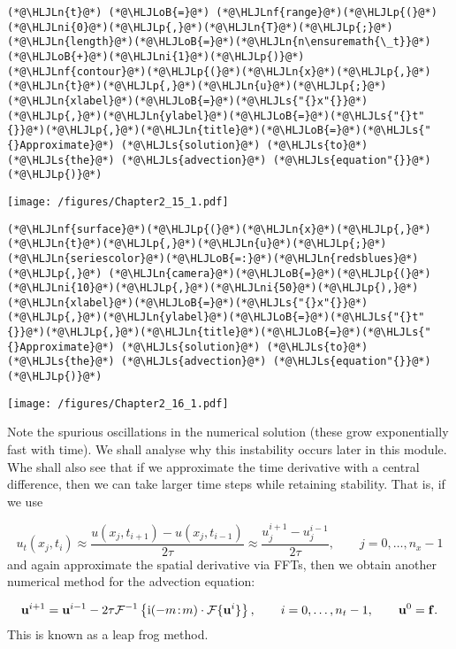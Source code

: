 \documentclass[12pt,a4paper]{article}
\newcommand{\HLJLn}[1]{#1}
\newcommand{\HLJLnf}[1]{\textcolor[RGB]{66,102,213}{#1}}
\newcommand{\HLJLs}[1]{\textcolor[RGB]{201,61,57}{#1}}
\newcommand{\HLJLni}[1]{\textcolor[RGB]{59,151,46}{#1}}
\newcommand{\HLJLoB}[1]{\textcolor[RGB]{102,102,102}{\textbf{#1}}}
\newcommand{\HLJLp}[1]{#1}
\begin{document}
\begin{lstlisting}
(*@\HLJLn{t}@*) (*@\HLJLoB{=}@*) (*@\HLJLnf{range}@*)(*@\HLJLp{(}@*)(*@\HLJLni{0}@*)(*@\HLJLp{,}@*)(*@\HLJLn{T}@*)(*@\HLJLp{;}@*)(*@\HLJLn{length}@*)(*@\HLJLoB{=}@*)(*@\HLJLn{n\ensuremath{\_t}}@*)(*@\HLJLoB{+}@*)(*@\HLJLni{1}@*)(*@\HLJLp{)}@*)
(*@\HLJLnf{contour}@*)(*@\HLJLp{(}@*)(*@\HLJLn{x}@*)(*@\HLJLp{,}@*)(*@\HLJLn{t}@*)(*@\HLJLp{,}@*)(*@\HLJLn{u}@*)(*@\HLJLp{;}@*)(*@\HLJLn{xlabel}@*)(*@\HLJLoB{=}@*)(*@\HLJLs{"{}x"{}}@*)(*@\HLJLp{,}@*)(*@\HLJLn{ylabel}@*)(*@\HLJLoB{=}@*)(*@\HLJLs{"{}t"{}}@*)(*@\HLJLp{,}@*)(*@\HLJLn{title}@*)(*@\HLJLoB{=}@*)(*@\HLJLs{"{}Approximate}@*) (*@\HLJLs{solution}@*) (*@\HLJLs{to}@*) (*@\HLJLs{the}@*) (*@\HLJLs{advection}@*) (*@\HLJLs{equation"{}}@*)(*@\HLJLp{)}@*)
\end{lstlisting}

\texttt{[image: /figures/Chapter2\_15\_1.pdf]}

\begin{lstlisting}
(*@\HLJLnf{surface}@*)(*@\HLJLp{(}@*)(*@\HLJLn{x}@*)(*@\HLJLp{,}@*)(*@\HLJLn{t}@*)(*@\HLJLp{,}@*)(*@\HLJLn{u}@*)(*@\HLJLp{;}@*)(*@\HLJLn{seriescolor}@*)(*@\HLJLoB{=:}@*)(*@\HLJLn{redsblues}@*)(*@\HLJLp{,}@*) (*@\HLJLn{camera}@*)(*@\HLJLoB{=}@*)(*@\HLJLp{(}@*)(*@\HLJLni{10}@*)(*@\HLJLp{,}@*)(*@\HLJLni{50}@*)(*@\HLJLp{),}@*)
(*@\HLJLn{xlabel}@*)(*@\HLJLoB{=}@*)(*@\HLJLs{"{}x"{}}@*)(*@\HLJLp{,}@*)(*@\HLJLn{ylabel}@*)(*@\HLJLoB{=}@*)(*@\HLJLs{"{}t"{}}@*)(*@\HLJLp{,}@*)(*@\HLJLn{title}@*)(*@\HLJLoB{=}@*)(*@\HLJLs{"{}Approximate}@*) (*@\HLJLs{solution}@*) (*@\HLJLs{to}@*) (*@\HLJLs{the}@*) (*@\HLJLs{advection}@*) (*@\HLJLs{equation"{}}@*)(*@\HLJLp{)}@*)
\end{lstlisting}

\texttt{[image: /figures/Chapter2\_16\_1.pdf]}

Note the spurious oscillations in the numerical solution (these grow exponentially fast with time).  We shall analyse why this instability occurs later in this module.  Whe shall also see that if we approximate the time derivative with a central difference, then we can take larger time steps while retaining stability. That is, if we use

\[
u_t(x_j,t_i) \approx \frac{u(x_j,t_{i+1}) - u(x_j,t_{i-1})}{2\tau} \approx \frac{u^{i+1}_j - u^{i-1}_j}{2\tau}, \qquad j = 0, \ldots, n_x-1
\]
and again approximate the spatial derivative via FFTs, then we obtain another numerical method for the advection equation:

\[
\mathbf{u}^{i+1} = \mathbf{u}^{i-1} - 2\tau \mathcal{F}^{-1}\left\lbrace {\rm i}(-m\!:\!m)\cdot\mathcal{F}\lbrace \mathbf{u}^{i} \rbrace\right\rbrace, \qquad i = 0, \ldots, n_t-1, \qquad \mathbf{u}^0 = \mathbf{f}.
\]
This is known as a leap frog method.
\end{document}
